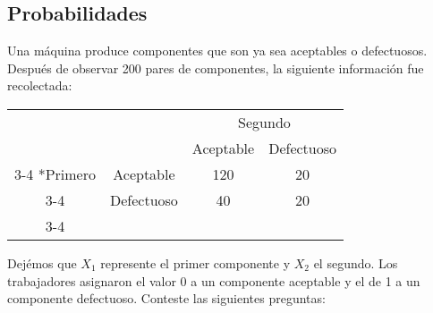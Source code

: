 \documentclass[11pt]{exam}
\begin{document}
%
%
%
\begin{questions}
\section*{Probabilidades}
\addpoints
\question Una m\'aquina produce componentes que son ya sea aceptables o defectuosos. Despu\'es de observar 200 pares de componentes, la siguiente informaci\'on fue recolectada:


 \begin{table}[h!]
	\centering
    \setlength{\extrarowheight}{2pt}
    \begin{tabular}{cc|c|c|}
      & \multicolumn{1}{c}{} & \multicolumn{2}{c}{Segundo}\\
      & \multicolumn{1}{c}{} & \multicolumn{1}{c}{Aceptable}  & \multicolumn{1}{c}{Defectuoso} \\\cline{3-4}
      \multirow{2}*{Primero}  & Aceptable & 120 & 20 \\\cline{3-4}
      & Defectuoso & 40 & 20 \\\cline{3-4}
    \end{tabular}
  \end{table}


Dej\'emos que $X_1$ represente el primer componente y $X_2$ el segundo. Los trabajadores asignaron el valor 0 a un componente aceptable y el de 1 a un componente defectuoso. Conteste las siguientes preguntas:
\newpage


\end{questions}
\end{document}
